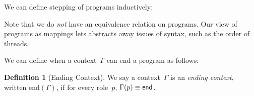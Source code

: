 \documentclass{article}
\theoremstyle{definition}
\newtheorem{defn}{Definition}
\newcommand{\subst}[3]{#1~[#2 \mapsto #3]}
\begin{document}
We can define stepping of programs inductively:
Note that we do \emph{not} have an equivalence relation on programs.
Our view of programs as mappings lets abstracts away issues of syntax, such as the order of threads.

We can define when a context~$\Gamma$ can end a program as follows:
\begin{defn}[Ending Context]
  We say a context~$\Gamma$ is an \emph{ending context}, written $\text{end}(\Gamma)$, if for every role~$p$, $\Gamma(p) \equiv \textsf{end}$.
\end{defn}
\end{document}
